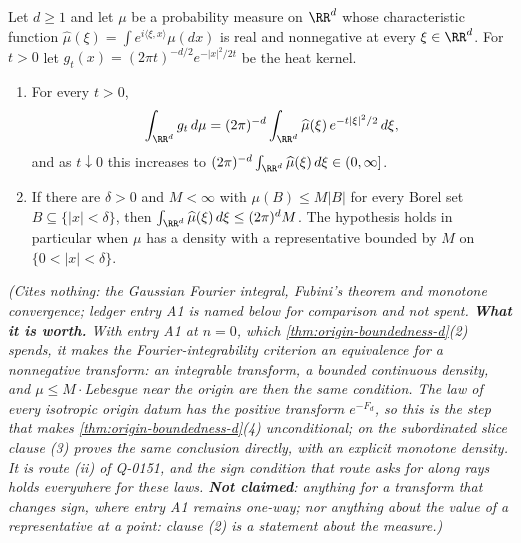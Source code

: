 \begin{lemma}
\label{lem:positive-transform-origin}
\leanok
Let $d \ge 1$ and let $\mu$ be a probability measure on $\RR^d$ whose characteristic function
$\widehat\mu(\xi) = \int e^{i\langle\xi,x\rangle}\mu(dx)$ is real and nonnegative at every
$\xi \in \RR^d$. For $t > 0$ let $g_t(x) = (2\pi t)^{-d/2}e^{-|x|^2/2t}$ be the heat kernel.
\begin{enumerate}
\item For every $t > 0$,
\[
  \int_{\RR^d} g_t\,d\mu = (2\pi)^{-d}\int_{\RR^d}\widehat\mu(\xi)\,e^{-t|\xi|^2/2}\,d\xi ,
\]
and as $t \downarrow 0$ this increases to $(2\pi)^{-d}\int_{\RR^d}\widehat\mu(\xi)\,d\xi \in (0,\infty]$.
\item If there are $\delta > 0$ and $M < \infty$ with $\mu(B) \le M|B|$ for every Borel set
$B \subseteq \{|x| < \delta\}$, then $\int_{\RR^d}\widehat\mu(\xi)\,d\xi \le (2\pi)^d M$. The
hypothesis holds in particular when $\mu$ has a density with a representative bounded by $M$ on
$\{0 < |x| < \delta\}$.
\end{enumerate}
\statusT\quad\emph{(Cites nothing: the Gaussian Fourier integral, Fubini's theorem and monotone
convergence; ledger entry A1 is named below for comparison and not spent. \textbf{What it is
worth.} With entry A1 at $n = 0$, which \ref{thm:origin-boundedness-d}(2) spends, it makes the
Fourier-integrability criterion an equivalence for a nonnegative transform: an integrable transform,
a bounded continuous density, and $\mu \le M\cdot$Lebesgue near the origin are then the same
condition. The law of every isotropic origin datum has the positive transform $e^{-F_d}$, so this is
the step that makes \ref{thm:origin-boundedness-d}(4) unconditional; on the subordinated slice
clause (3) proves the same conclusion directly, with an explicit monotone density. It is route (ii) of Q-0151,
and the sign condition that route asks for along rays holds everywhere for these laws. \textbf{Not
claimed}: anything for a transform that changes sign, where entry A1 remains one-way; nor
anything about the value of a representative at a point: clause (2) is a statement about the
measure.)}
\end{lemma}

